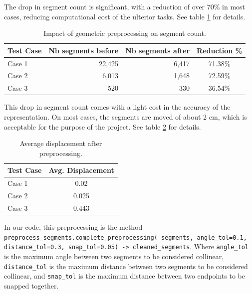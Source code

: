 \documentclass[11pt]{article}
\begin{document}
The drop in segment count is significant, with a reduction of over 70\% in most cases, 
reducing computational cost of the ulterior tasks. See table \ref{tab:segment_count} for details.

\begin{table}[htb!]
    \centering
    \begin{tabular}{|l|rrc|}
        \hline
        \textbf{Test Case} & \textbf{Nb segments before} & \textbf{Nb segments after} & \textbf{Reduction \%} \\
        \hline

        Case 1 & 22,425 & 6,417 & 71.38\% \\
        Case 2 & 6,013 & 1,648 & 72.59\% \\
        Case 3 & 520 & 330 & 36.54\% \\
        \hline
    \end{tabular}
    \caption{Impact of geometric preprocessing on segment count.}
    \label{tab:segment_count}
\end{table}

This drop in segment count comes with a light cost in the accuracy of the representation.
On most cases, the segments are moved of about 2 cm, which is acceptable for the
purpose of the project. See table \ref{tab:avg_displacement} for details.

\begin{table}[htb!]
    \centering
    \begin{tabular}{|l|c|}
        \hline

        \textbf{Test Case} & \textbf{Avg. Displacement} \\
        \hline
        Case 1 & 0.02 \\
        Case 2 & 0.025 \\
        Case 3 & 0.443 \\
        \hline

    \end{tabular}
    \caption{Average displacement after preprocessing.}
    \label{tab:avg_displacement}
\end{table}

In our code, this preprocessing is the method 
\texttt{preprocess\_segments.complete\_preprocessing(
    segments, angle\_tol=0.1, distance\_tol=0.3, snap\_tol=0.05) -> cleaned\_segments}.
    Where \texttt{angle\_tol} is the maximum angle between two segments to be considered collinear,
    \texttt{distance\_tol} is the maximum distance between two segments to be considered collinear,
    and \texttt{snap\_tol} is the maximum distance between two endpoints to be snapped together.
\end{document}
